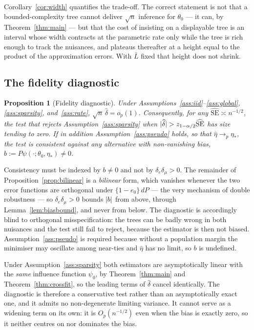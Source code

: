 \documentclass[11pt]{article}
\theoremstyle{plain}
\newtheorem{proposition}[theorem]{Proposition}
\theoremstyle{definition}
\theoremstyle{remark}
\newcommand{\ez}{e_0}
\DeclarePairedDelimiter{\abs}{\lvert}{\rvert}
\begin{document}
\noindent Corollary~\ref{cor:width} quantifies the trade-off. The correct
statement is not that a bounded-complexity tree cannot deliver $\sqrt n$
inference for $\theta_0$ --- it can, by Theorem~\ref{thm:main} --- but that the
cost of insisting on a displayable tree is an interval whose width contracts at
the parametric rate only while the tree is rich enough to track the nuisances,
and plateaus thereafter at a height equal to the product of the approximation
errors. With $\bar L$ fixed that height does not shrink.

\subsection{The fidelity diagnostic}

\begin{proposition}[Fidelity diagnostic]\label{prop:spectest}
Under Assumptions~\ref{ass:iid}--\ref{ass:global}, \ref{ass:sparsity},
and~\ref{ass:rate}, $\sqrt n\,\widehat\delta=o_p(1)$. Consequently, for any
$\widehat{\mathrm{SE}}\asymp n^{-1/2}$, the test that rejects
Assumption~\ref{ass:sparsity} when
$\abs{\widehat\delta}>z_{1-\alpha/2}\widehat{\mathrm{SE}}$ has size tending to
zero. If in addition Assumption~\ref{ass:pseudo} holds, so that
$\widehat\eta\to_p\eta_*$, the test is consistent against any alternative with
non-vanishing bias, $b:=P\psi(\cdot;\theta_0,\eta_*)\ne0$.
\end{proposition}

\noindent Consistency must be indexed by $b\ne0$ and not by
$\delta_e\delta_\mu>0$. The remainder of Proposition~\ref{prop:bilinear} is a
\emph{bilinear} form, which vanishes whenever the two error functions are
orthogonal under $\{1-\ez\}\,dP$ --- the very mechanism of double robustness --- so
$\delta_e\delta_\mu>0$ bounds $\abs b$ from above, through
Lemma~\ref{lem:biasbound}, and never from below. The diagnostic is accordingly
blind to orthogonal misspecification: the trees can be badly wrong in both
nuisances and the test still fail to reject, because the estimator is then not
biased. Assumption~\ref{ass:pseudo} is required because without a population
margin the minimiser may oscillate among near-ties and $\widehat\eta$ has no
limit, so $b$ is undefined.

\noindent Under Assumption~\ref{ass:sparsity} both estimators are
asymptotically linear with the \emph{same} influence function $\psi_0$, by
Theorem~\ref{thm:main} and Theorem~\ref{thm:crossfit}, so the leading terms of
$\widehat\delta$ cancel identically. The diagnostic is therefore a conservative
test rather than an asymptotically exact one, and it admits no non-degenerate
limiting variance. It cannot serve as a widening term on its own: it is
$O_p(n^{-1/2})$ even when the bias is exactly zero, so it neither centres on nor
dominates the bias.
\end{document}
